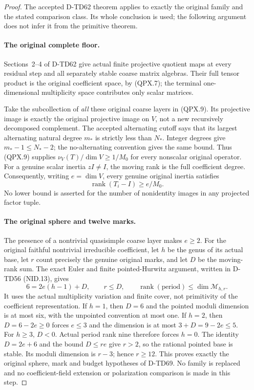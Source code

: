 \begin{proof}
The accepted D-TD62 theorem applies to exactly the original family
and the stated comparison class. Its whole conclusion is used;
the following argument does not infer it from the primitive theorem.

\paragraph{The original complete floor.}
Sections~2--4 of D-TD62 give actual finite projective quotient maps
at every residual step and all separately stable coarse matrix
algebras. Their full tensor product is the original coefficient
space, by (QPX.7); the terminal one-dimensional multiplicity space
contributes only scalar matrices.

Take the subcollection of \emph{all} these original coarse layers
in (QPX.9). Its projective image is exactly the original projective
image on \(V\), not a new recursively decomposed complement.
The accepted alternating cutoff says that its largest alternating
natural degree \(m_*\) is strictly less than \(N_*\).
Integer degrees give \(m_*-1\le N_*-2\); the no-alternating
convention gives the same bound. Thus (QPX.9) supplies
\(\nu_V(T)/\dim V\ge1/M_0\) for every nonscalar original operator.
For a genuine scalar inertia \(zI\ne I\), the moving rank is
the full coefficient degree. Consequently, writing \(e=\dim V\),
every genuine original inertia satisfies
\[
                  \operatorname{rank}(T_i-I)\ge e/M_0.
 \tag{QUA.3}
\]
No lower bound is asserted for the number of nonidentity images
in any projected factor tuple.

\paragraph{The original sphere and twelve marks.}
The presence of a nontrivial quasisimple coarse layer makes \(e\ge2\).
For the original faithful nontrivial irreducible coefficient, let
\(h\) be the genus of its actual base, let \(r\) count precisely
the genuine original marks, and let \(D\) be the moving-rank sum.
The exact Euler and finite pointed-Hurwitz argument, written in
D-TD56 (NID.13), gives
\[
 6=2e(h-1)+D,\qquad r\le D,\qquad
 \operatorname{rank}(\mathrm{period})
       \le\dim\mathcal M_{h,r}.
 \tag{QUA.4}
\]
It uses the actual multiplicity variation and finite cover, not
primitivity of the coefficient representation.
If \(h=1\), then \(D=6\) and the pointed moduli dimension is at
most six, with the unpointed convention at most one.
If \(h=2\), then \(D=6-2e\ge0\) forces \(e\le3\) and the
dimension is at most \(3+D=9-2e\le5\).
For \(h\ge3\), \(D<0\). Actual period rank nine therefore forces
\(h=0\). The identity \(D=2e+6\) and the bound \(D\le re\)
give \(r>2\), so the rational pointed base is stable.
Its moduli dimension is \(r-3\); hence \(r\ge12\).
This proves exactly the original sphere, mark and budget hypotheses
of D-TD69. No family is replaced and no coefficient-field extension
or polarization comparison is made in this step.


\end{proof}
